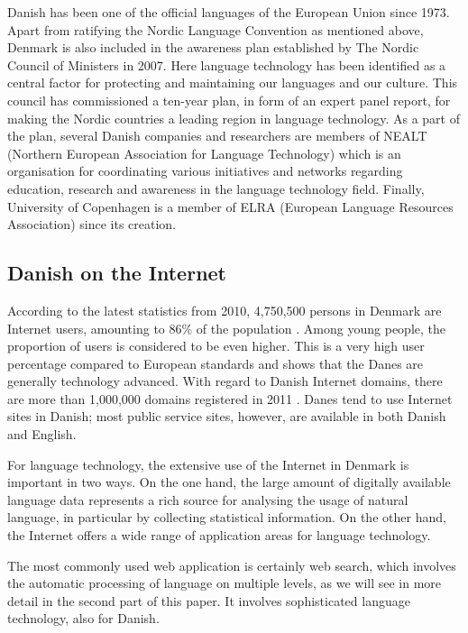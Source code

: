 \documentclass[]{../../metanetpaper}
\begin{document}
\begin{multicols}{2}
  Danish has been one of the official languages of the European Union since 1973.  Apart from ratifying the Nordic Language Convention as mentioned above, Denmark is also included in the awareness plan established by The Nordic Council of Ministers in 2007. Here language technology has been identified as a central factor for protecting and maintaining our languages and our culture. This council has commissioned a ten-year plan, in form of an expert panel report, for making the Nordic countries a leading region in language technology. As a part of the plan, several Danish companies and researchers are members of NEALT (Northern European Association for Language Technology) which is an organisation for coordinating various initiatives and networks regarding education, research and awareness in the language technology field. Finally, University of Copenhagen is a member of ELRA (European Language Resources Association) since its creation.


\subsection{Danish on the Internet}

 According to the latest statistics from 2010, 4,750,500 persons in Denmark are Internet users, amounting to 86\% of the population \cite{worldstats}.  Among young people, the proportion of users is considered to be even higher. This is a very high user percentage compared to European standards and shows that the Danes are generally technology advanced. With regard to Danish Internet domains, there are more than 1,000,000 domains registered in 2011 \cite{hostmaster}. Danes tend to use Internet sites in Danish; most public service sites, however, are available in both Danish and English.

 
For language technology, the extensive use of the Internet in Denmark is important in two ways. On the one hand, the large amount of digitally available language data represents a rich source for analysing the usage of natural language, in particular by collecting statistical information. On the other hand, the Internet offers a wide range of application areas for language technology. 

The most commonly used web application is certainly web search, which involves the automatic processing of language on multiple levels, as we will see in more detail in the second part of this paper. It involves sophisticated language technology, also for Danish.  


\end{multicols}
\end{document}
